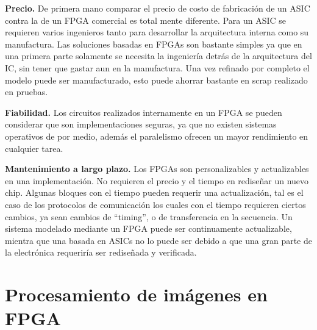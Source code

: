 \documentclass[twoside,spanish,ESP,MSc]{plantillaLabUPV}
\theoremstyle{definition}
\newcommand{\f}{FPGA }
\newcommand{\fs}{FPGAs }
\begin{document}
\checkmark\textbf{Precio.} De primera mano comparar el precio de costo de fabricación de un ASIC contra la de un \f comercial es total mente diferente. Para un ASIC se requieren varios ingenieros tanto para desarrollar la arquitectura interna como su manufactura. Las soluciones basadas en \fs son bastante simples ya que en una primera parte solamente se necesita la ingeniería detrás de la arquitectura del IC, sin tener que gastar aun en la manufactura. Una vez refinado por completo el modelo puede ser manufacturado, esto puede ahorrar bastante en scrap realizado en pruebas.%


\checkmark\textbf{Fiabilidad.} Los circuitos realizados internamente en un \f se pueden considerar que son implementaciones seguras, ya que no existen sistemas operativos de por medio, además el paralelismo ofrecen un mayor rendimiento en cualquier tarea. 

\checkmark\textbf{Mantenimiento a largo plazo.} Los \fs son personalizables y actualizables en una implementación. No requieren el precio y el tiempo en rediseñar un nuevo chip. Algunas bloques con el tiempo pueden requerir una actualización, tal es el caso de los protocolos de comunicación los cuales con el tiempo requieren ciertos cambios, ya sean cambios de ``timing'', o de transferencia en la secuencia. Un sistema modelado mediante un FPGA puede ser continuamente actualizable, mientra que una basada en ASICs no lo puede ser debido a que una gran parte de la electrónica requeriría ser rediseñada y verificada. 



\section{Procesamiento de imágenes en FPGA}
\end{document}
